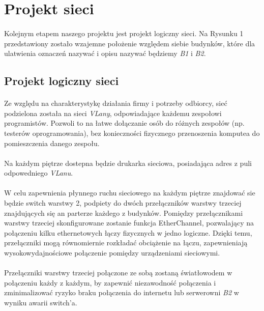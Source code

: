 \newpage
\section{Projekt sieci}
\paragraph{}
Kolejnym etapem naszego projektu jest projekt logiczny sieci. Na Rysunku 1 przedstawiony zostało wzajemne położenie względem siebie budynków, które dla ulatwienia oznaczeń nazywać i opisu nazywać będziemy \textit{B1} i \textit{B2}.

\subsection{Projekt logiczny sieci}
\paragraph{}
Ze względu na charakterystykę działania firmy i potrzeby odbiorcy, sieć podzielona została na sieci \textit{VLany}, odpowiadające każdemu zespołowi programistów. Pozwoli to na łatwe dołączanie osób do różnych zespołów (np. testerów oprogramowania), bez konieczności fizycznego przenoszenia komputea do pomieszczenia danego zespołu.

\paragraph{}
Na każdym piętrze dostepna będzie drukarka sieciowa, posiadająca adres z puli odpowedniego \textit{VLanu}.

\paragraph{}
W celu zapewnienia płynnego ruchu sieciowego na każdym piętrze znajdować sie będzie switch warstwy 2, podpiety do dwóch przełączników warstwy trzeciej znajdujących się an parterze każdego z budynków. Pomiędzy przełącznikami warstwy trzeciej skonfigurowane zostanie funkcja EtherChannel, pozwalający na połączeniu kilku ethernetowych łączy fizycznych w jedno logiczne. Dzięki temu, przełączniki mogą równomiernie rozkładać obciążenie na łączu, zapewnieniają wysokowydajnościowe połączenie pomiędzy urządzeniami sieciowymi.

\paragraph{}
Przełączniki warstwy trzeciej połączone ze sobą zostaną światłowodem w połączeniu każdy z każdym, by zapewnić niezawodność połączenia i zminimalizować ryzyko braku połączenia do internetu lub serwerowni \textit{B2} w wyniku awarii switch'a.

